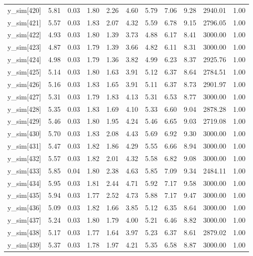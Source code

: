 \begin{table}[ht]
\begin{tabular}{rrrrrrrrrrr}
  y\_sim[420] & 5.81 & 0.03 & 1.80 & 2.26 & 4.60 & 5.79 & 7.06 & 9.28 & 2940.01 & 1.00 \\ 
  y\_sim[421] & 5.57 & 0.03 & 1.83 & 2.07 & 4.32 & 5.59 & 6.78 & 9.15 & 2796.05 & 1.00 \\ 
  y\_sim[422] & 4.93 & 0.03 & 1.80 & 1.39 & 3.73 & 4.88 & 6.17 & 8.41 & 3000.00 & 1.00 \\ 
  y\_sim[423] & 4.87 & 0.03 & 1.79 & 1.39 & 3.66 & 4.82 & 6.11 & 8.31 & 3000.00 & 1.00 \\ 
  y\_sim[424] & 4.98 & 0.03 & 1.79 & 1.36 & 3.82 & 4.99 & 6.23 & 8.37 & 2925.76 & 1.00 \\ 
  y\_sim[425] & 5.14 & 0.03 & 1.80 & 1.63 & 3.91 & 5.12 & 6.37 & 8.64 & 2784.51 & 1.00 \\ 
  y\_sim[426] & 5.16 & 0.03 & 1.83 & 1.65 & 3.91 & 5.11 & 6.37 & 8.73 & 2901.97 & 1.00 \\ 
  y\_sim[427] & 5.31 & 0.03 & 1.79 & 1.83 & 4.13 & 5.31 & 6.53 & 8.77 & 3000.00 & 1.00 \\ 
  y\_sim[428] & 5.35 & 0.03 & 1.83 & 1.69 & 4.10 & 5.33 & 6.60 & 9.04 & 2878.28 & 1.00 \\ 
  y\_sim[429] & 5.46 & 0.03 & 1.80 & 1.95 & 4.24 & 5.46 & 6.65 & 9.03 & 2719.08 & 1.00 \\ 
  y\_sim[430] & 5.70 & 0.03 & 1.83 & 2.08 & 4.43 & 5.69 & 6.92 & 9.30 & 3000.00 & 1.00 \\ 
  y\_sim[431] & 5.47 & 0.03 & 1.82 & 1.86 & 4.29 & 5.55 & 6.66 & 8.94 & 3000.00 & 1.00 \\ 
  y\_sim[432] & 5.57 & 0.03 & 1.82 & 2.01 & 4.32 & 5.58 & 6.82 & 9.08 & 3000.00 & 1.00 \\ 
  y\_sim[433] & 5.85 & 0.04 & 1.80 & 2.38 & 4.63 & 5.85 & 7.09 & 9.34 & 2484.11 & 1.00 \\ 
  y\_sim[434] & 5.95 & 0.03 & 1.81 & 2.44 & 4.71 & 5.92 & 7.17 & 9.58 & 3000.00 & 1.00 \\ 
  y\_sim[435] & 5.94 & 0.03 & 1.77 & 2.52 & 4.73 & 5.88 & 7.17 & 9.47 & 3000.00 & 1.00 \\ 
  y\_sim[436] & 5.09 & 0.03 & 1.82 & 1.66 & 3.85 & 5.12 & 6.35 & 8.64 & 3000.00 & 1.00 \\ 
  y\_sim[437] & 5.24 & 0.03 & 1.80 & 1.79 & 4.00 & 5.21 & 6.46 & 8.82 & 3000.00 & 1.00 \\ 
  y\_sim[438] & 5.17 & 0.03 & 1.77 & 1.64 & 3.97 & 5.23 & 6.37 & 8.61 & 2879.02 & 1.00 \\ 
  y\_sim[439] & 5.37 & 0.03 & 1.78 & 1.97 & 4.21 & 5.35 & 6.58 & 8.87 & 3000.00 & 1.00 \\ 

\end{tabular}
\end{table}
